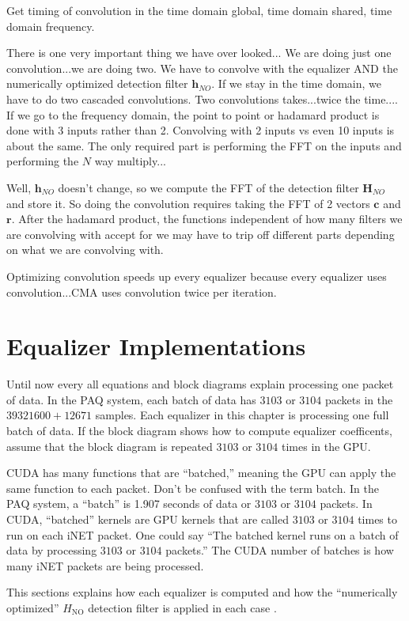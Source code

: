 Get timing of convolution in the time domain global, time domain shared, time domain frequency.

There is one very important thing we have over looked...
We are doing just one convolution...we are doing two.
We have to convolve with the equalizer AND the numerically optimized detection filter $\mathbf{h}_{NO}$.
If we stay in the time domain, we have to do two cascaded convolutions.
Two convolutions takes...twice the time....
If we go to the frequency domain, the point to point or hadamard product is done with 3 inputs rather than 2.
Convolving with 2 inputs vs even 10 inputs is about the same.
The only required part is performing the FFT on the inputs and performing the $N$ way multiply...

Well, $\mathbf{h}_{NO}$ doesn't change, so we compute the FFT of the detection filter $\mathbf{H}_{NO}$ and store it.
So doing the convolution requires taking the FFT of 2 vectors $\mathbf{c}$ and $\mathbf{r}$.
After the hadamard product, the functions independent of how many filters we are convolving with accept for we may have to trip off different parts depending on what we are convolving with.

Optimizing convolution speeds up every equalizer because every equalizer uses convolution...CMA uses convolution twice per iteration. 

\section{Equalizer Implementations}
Until now every all equations and block diagrams explain processing one packet of data.
In the PAQ system, each batch of data has $3103$ or $3104$ packets in the $39321600+12671$ samples.
Each equalizer in this chapter is processing one full batch of data. 
If the block diagram shows how to compute equalizer coefficents, assume that the block diagram is repeated $3103$ or $3104$ times in the GPU.

CUDA has many functions that are ``batched,'' meaning the GPU can apply the same function to each packet.
Don't be confused with the term batch. 
In the PAQ system, a ``batch'' is 1.907 seconds of data or $3103$ or $3104$ packets.
In CUDA, ``batched'' kernels are GPU kernels that are called $3103$ or $3104$ times to run on each iNET packet.
One could say ``The batched kernel runs on a batch of data by processing $3103$ or $3104$ packets.'' 
The CUDA number of batches is how many iNET packets are being processed.

This sections explains how each equalizer is computed and how the ``numerically optimized'' $H_\text{NO}$ detection filter is applied in each case \cite[Fig. 3]{perrins:2013}.

